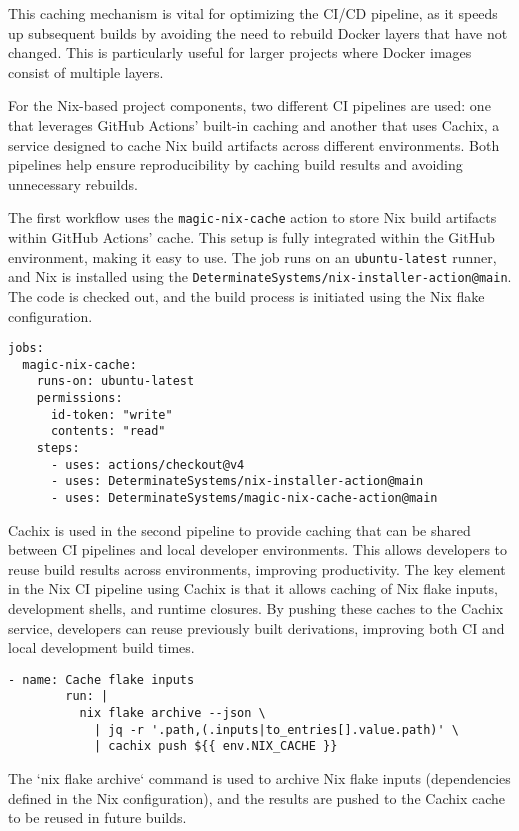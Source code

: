 This caching mechanism is vital for optimizing the CI/CD pipeline, as it speeds up
subsequent builds by avoiding the need to rebuild Docker layers that have not
changed. This is particularly useful for larger projects where Docker images
consist of multiple layers.

For the Nix-based project components, two different CI pipelines are used: one that
leverages GitHub Actions' built-in caching and another that uses Cachix, a service
designed to cache Nix build artifacts across different environments. Both pipelines
help ensure reproducibility by caching build results and avoiding unnecessary
rebuilds.

The first workflow uses the \texttt{magic-nix-cache} action to store Nix build
artifacts within GitHub Actions’ cache. This setup is fully integrated within the
GitHub environment, making it easy to use.
The job runs on an \texttt{ubuntu-latest} runner, and Nix is installed using the
\texttt{DeterminateSystems/nix-installer-action@main}. The code is checked out, and
the build process is initiated using the Nix flake configuration.

\begin{lstlisting}[caption={GitHub Runner and Nix Installation}]
jobs:
  magic-nix-cache:
    runs-on: ubuntu-latest
    permissions:
      id-token: "write"
      contents: "read"
    steps:
      - uses: actions/checkout@v4
      - uses: DeterminateSystems/nix-installer-action@main
      - uses: DeterminateSystems/magic-nix-cache-action@main
\end{lstlisting}

Cachix is used in the second pipeline to provide caching that can be shared between
CI pipelines and local developer environments. This allows developers to reuse
build results across environments, improving productivity.
The key element in the Nix CI pipeline using Cachix is that it allows caching
of Nix flake inputs, development shells, and runtime closures. By pushing
these caches to the Cachix service, developers can reuse previously built
derivations, improving both CI and local development build times.

\begin{lstlisting}[caption={Caching Nix Flake Inputs}]
      - name: Cache flake inputs
        run: |
          nix flake archive --json \
            | jq -r '.path,(.inputs|to_entries[].value.path)' \
            | cachix push ${{ env.NIX_CACHE }}
\end{lstlisting}

The `nix flake archive` command is used to archive Nix flake inputs (dependencies
defined in the Nix configuration), and the results are pushed to the Cachix cache
to be reused in future builds.

